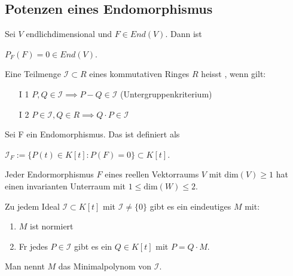\documentclass[9pt, a4paper, twocolumn, landscape]{article}
\begin{document}
\subsection{Potenzen eines Endomorphismus}
\begin{theorem}
 Sei $V$ endlichdimensional und $F \in End(V)$. Dann ist
\\ \centerline{$P_F(F) = 0 \in End(V)$.}
\end{theorem}
\begin{definition}
Eine Teilmenge $\mathcal{I} \subset R$ eines kommutativen Ringes $R$ heisst , wenn gilt:
\begin{enumerate}
\item[I 1] $P, Q \in \mathcal{I} \implies P - Q \in \mathcal{I}$ (Untergruppenkriterium)
\item[I 2] $P \in \mathcal{I}, Q \in R \implies Q \cdot P \in \mathcal{I}$
\end{enumerate}


\end{definition}

\begin{definition}
Sei F ein Endomorphismus. Das  ist definiert als
\\ \centerline{$\mathcal{I}_F := \{ P(t) \in K[t] : P(F) = 0  \} \subset K[t]$.}
\end{definition}

\begin{lemma}
Jeder Endormorphismus $F$ eines reellen Vektorraums $V$ mit $\mathrm{dim}(V) \geq 1$ hat einen invarianten Unterraum mit $1 \leq \mathrm{dim}(W) \leq 2$.
\end{lemma}





\begin{theorem}
Zu jedem Ideal $\mathcal{I} \subset K[t]$ mit $\mathcal{I} \neq \{0\}$ gibt es ein eindeutiges  $M$ mit:
\begin{enumerate}
\item $M$ ist normiert
\item F\uee r jedes $P \in \mathcal{I}$ gibt es ein $Q \in K[t]$ mit $P = Q \cdot M$.
\end{enumerate}
Man nennt $M$ das Minimalpolynom von $\mathcal{I}$.
\end{theorem}
\end{document}
